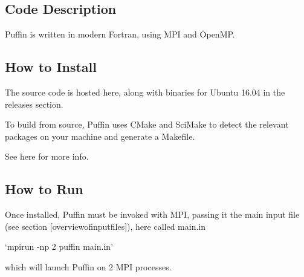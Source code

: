 \subsection{Code Description}

Puffin is written in modern Fortran, using MPI and OpenMP.

\subsection{How to Install}

The source code is hosted here, along with binaries for Ubuntu 16.04 in the releases section.

To build from source, Puffin uses CMake and SciMake to detect the relevant packages on your machine and generate a Makefile.

See here for more info.


\subsection{How to Run}

Once installed, Puffin must be invoked with MPI, passing it the main input file (see section [overviewofinputfiles]), here called main.in

`mpirun -np 2 puffin main.in'

which will launch Puffin on 2 MPI processes.
